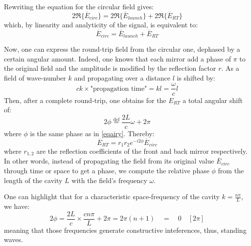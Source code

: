 \documentclass[11pt]{report}
\begin{document}
Rewriting the equation for the circular field gives:
\begin{equation}
2\Re\{\overline{E}_{circ}\} = 2\Re\{\overline{E}_{launch}\} + 2\Re\{\overline{E}_{RT}\}
\end{equation}
which, by linearity and analyticity of the signal, is equivalent to:
\begin{equation}
\label{eqecirc}
\overline{E}_{circ} = \overline{E}_{launch} + \overline{E}_{RT}
\end{equation}

Now, one can express the round-trip field from the circular one, dephased by a certain angular amount. Indeed, one knows that each mirror add a phase of $\pi$ to the original field and the amplitude is modified by the reflection factor $r$. As a field of wave-number $k$ and propagating over a distance $l$ is shifted by:
\begin{equation}
ck \times \textrm{"propagation time"} = kl = \frac{\omega}{c}l
\end{equation} 
Then, after a complete round-trip, one obtains for the $E_{RT}$ a total angular shift of:
\begin{equation}
2\phi \stackrel{\text{def}}{=} \frac{2L}{c}\omega + 2\pi
\end{equation} 
where $\phi$ is the same phase as in \eqref{eqairy}. Thereby:
\begin{equation}
\label{eqrt}
\overline{E}_{RT} = r_1 r_2 e^{-i2\phi} \overline{E}_{circ}
\end{equation}
where $r_{1,2}$ are the reflection coefficients of the front and back mirror respectively. In other words, instead of propagating the field from its original value $ \overline{E}_{circ}$ through time or space to get a phase, we compute the relative phase $\phi$ from the length of the cavity $L$ with the field's frequency $\omega$.

One can highlight that for a characteristic space-frequency of the cavity $k=\frac{n\pi}{L}$, we have:
\begin{equation}
\label{phimodif}
2\phi = \frac{2L}{c} \times \frac{cn\pi}{L} + 2\pi = 2\pi(n + 1) \quad = \quad 0 \quad [2\pi]
\end{equation}
meaning that those frequencies generate constructive inteferences, thus, standing waves.
\end{document}
